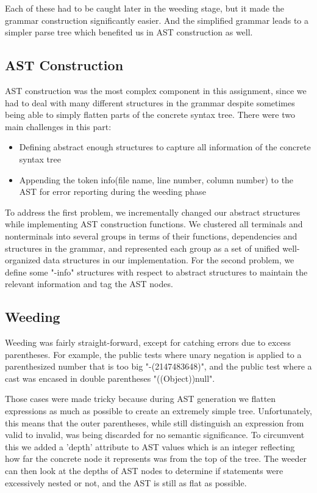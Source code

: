 \documentclass[12pt,letterpaper]{article}
\begin{document}
Each of these had to be caught later in the weeding stage, but it made the grammar construction significantly easier. And the simplified grammar leads to a simpler parse tree which benefited us in AST construction as well.

\subsection{AST Construction}
AST construction was the most complex component in this assignment, since we had to deal with many different structures in the grammar despite sometimes being able to simply flatten parts of the concrete syntax tree. There were two main challenges in this part:
\begin{itemize}
  \item Defining abstract enough structures to capture all information of the concrete syntax tree
  \item Appending the token info(file name, line number, column number) to the AST for error reporting during the weeding phase
\end{itemize}
To address the first problem, we incrementally changed our abstract structures while implementing AST construction functions.
We clustered all terminals and nonterminals into several groups in terms of their functions, dependencies and structures in the grammar, and represented each group as a set of unified well-organized data structures in our implementation.
For the second problem, we define some "-info" structures with respect to abstract structures to maintain the relevant information and tag the AST nodes.


\subsection{Weeding}
Weeding was fairly straight-forward, except for catching errors due to excess parentheses. For example, the public tests where unary negation is applied to a parenthesized number that is too big "-(2147483648)", and the public test where a cast was encased in double parentheses "((Object))null".

Those cases were made tricky because during AST generation we flatten expressions as much as possible to create an extremely simple tree. Unfortunately, this means that the outer parentheses, while still distinguish an expression from valid to invalid, was being discarded for no semantic significance. To circumvent this we added a 'depth' attribute to AST values which is an integer reflecting how far the concrete node it represents was from the top of the tree. The weeder can then look at the depths of AST nodes to determine if statements were excessively nested or not, and the AST is still as flat as possible.
\end{document}

